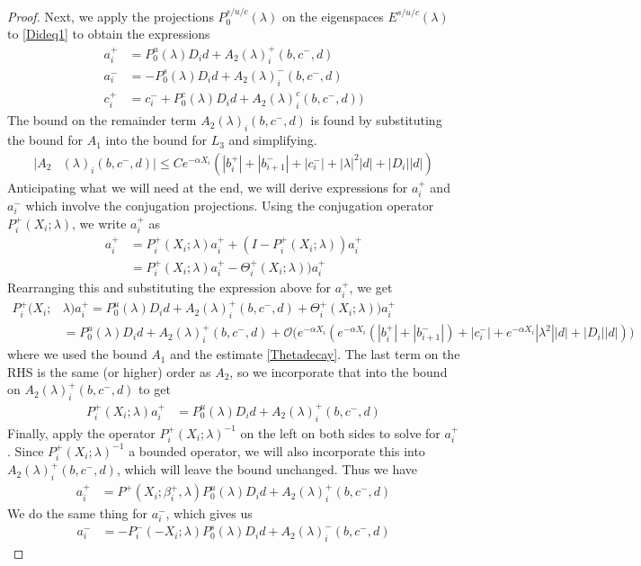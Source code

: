 \documentclass[thesis.tex]{subfiles}
\begin{document}
\begin{lemma}
\begin{proof}
Next, we apply the projections $P_0^{s/u/c}(\lambda)$ on the eigenspaces $E^{s/u/c}(\lambda)$ to \eqref{Dideq1} to obtain the expressions
\begin{align*}
a_i^+ &= P_0^u(\lambda) D_i d + A_2(\lambda)_i^+(b, c^-, d) \\
a_i^- &= -P_0^s(\lambda) D_i d + A_2(\lambda)_i^-(b, c^-, d) \\
c_i^+ &= c_i^- + P_0^c(\lambda) D_i d + A_2(\lambda)_i^c(b, c^-, d) )
\end{align*}
The bound on the remainder term $A_2(\lambda)_i(b, c^-, d)$ is found by substituting the bound for $A_1$ into the bound for $L_3$ and simplifying. 
\begin{align*}
|A_2&(\lambda)_i(b, c^-, d)|
\leq C e^{-\alpha X_i} \left( |b_i^+| + |b_{i+1}^-| + |c_i^-| + |\lambda|^2|d| + |D_i||d| \right)
\end{align*} 
Anticipating what we will need at the end, we will derive expressions for $a_i^+$ and $a_i^-$ which involve the conjugation projections. Using the conjugation operator $P_i^+(X_i; \lambda)$, we write $a_i^+$ as
\begin{align*}
a_i^+ 
&= P_i^+(X_i; \lambda)a_i^+ + (I - P_i^+(X_i; \lambda))a_i^+ \\
&= P_i^+(X_i; \lambda)a_i^+ - \Theta_i^+(X_i; \lambda))a_i^+
\end{align*}
Rearranging this and substituting the expression above for $a_i^+$, we get
\begin{align*}
P_i^+(X_i; &\lambda) a_i^+ = P_0^u(\lambda) D_i d + A_2(\lambda)_i^+(b, c^-, d) + \Theta_i^+(X_i; \lambda))a_i^+ \\
&= P_0^u(\lambda) D_i d + A_2(\lambda)_i^+(b, c^-, d) + \mathcal{O}\Big( e^{-\alpha X_i} ( e^{-\alpha X_i} (|b_i^+| + |b_{i+1}^-|) + |c_i^-| + e^{-\alpha X_i} |\lambda^2||d| + |D_i||d| )\Big)
\end{align*}
where we used the bound $A_1$ and the estimate \eqref{Thetadecay}. The last term on the RHS is the same (or higher) order as $A_2$, so we incorporate that into the bound on $A_2(\lambda)_i^+(b, c^-, d)$ to get
\begin{align*}
P_i^+(X_i; \lambda)a_i^+ &= P_0^u(\lambda) D_i d + A_2(\lambda)_i^+(b, c^-, d)
\end{align*}
Finally, apply the operator $P_i^+(X_i; \lambda)^{-1}$ on the left on both sides to solve for $a_i^+$. Since $P_i^+(X_i; \lambda)^{-1}$ a bounded operator, we will also incorporate this into $A_2(\lambda)_i^+(b, c^-, d)$, which will leave the bound unchanged. Thus we have
\begin{align*}
a_i^+ &= P^+(X_i; \beta_i^+, \lambda) P_0^u(\lambda) D_i d + A_2(\lambda)_i^+(b, c^-, d)
\end{align*}
We do the same thing for $a_i^-$, which gives us
\begin{align*}
a_i^- &= -P_i^-(-X_i; \lambda) P_0^s(\lambda) D_i d + A_2(\lambda)_i^-(b, c^-, d)
\end{align*}


\end{proof}
\end{lemma}
\end{document}
